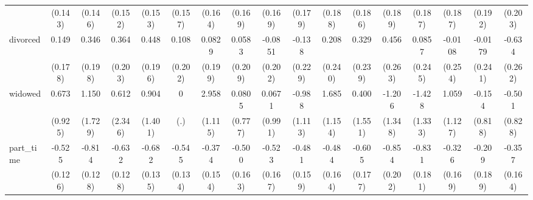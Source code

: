 {\begin{tabular}{l*{16}{c}}
                    &     (0.143)         &     (0.146)         &     (0.152)         &     (0.153)         &     (0.157)         &     (0.164)         &     (0.169)         &     (0.169)         &     (0.179)         &     (0.188)         &     (0.186)         &     (0.189)         &     (0.187)         &     (0.187)         &     (0.192)         &     (0.203)         \\
[1em]
divorced            &       0.149         &       0.346         &       0.364         &       0.448\sym{*}  &       0.108         &      0.0829         &      0.0583         &     -0.0851         &      -0.138         &       0.208         &       0.329         &       0.456         &      0.0857         &     -0.0108         &     -0.0179         &      -0.634\sym{*}  \\
                    &     (0.178)         &     (0.198)         &     (0.203)         &     (0.196)         &     (0.202)         &     (0.199)         &     (0.209)         &     (0.202)         &     (0.229)         &     (0.240)         &     (0.239)         &     (0.263)         &     (0.245)         &     (0.254)         &     (0.241)         &     (0.262)         \\
[1em]
widowed             &       0.673         &       1.150         &       0.612         &       0.904         &           0         &       2.958\sym{**} &      0.0805         &      0.0671         &      -0.988         &       1.685         &       0.400         &      -1.206         &      -1.428         &       1.059         &      -0.154         &      -0.501         \\
                    &     (0.925)         &     (1.729)         &     (2.346)         &     (1.401)         &         (.)         &     (1.115)         &     (0.777)         &     (0.991)         &     (1.113)         &     (1.154)         &     (1.551)         &     (1.348)         &     (1.333)         &     (1.127)         &     (0.818)         &     (0.828)         \\
[1em]
part\_time           &      -0.525\sym{***}&      -0.814\sym{***}&      -0.632\sym{***}&      -0.682\sym{***}&      -0.545\sym{***}&      -0.374\sym{*}  &      -0.500\sym{**} &      -0.523\sym{**} &      -0.481\sym{**} &      -0.484\sym{**} &      -0.605\sym{***}&      -0.854\sym{***}&      -0.831\sym{***}&      -0.326         &      -0.209         &      -0.357\sym{*}  \\
                    &     (0.126)         &     (0.128)         &     (0.128)         &     (0.135)         &     (0.134)         &     (0.154)         &     (0.163)         &     (0.167)         &     (0.159)         &     (0.164)         &     (0.177)         &     (0.202)         &     (0.181)         &     (0.169)         &     (0.189)         &     (0.164)         \\

\end{tabular}}
